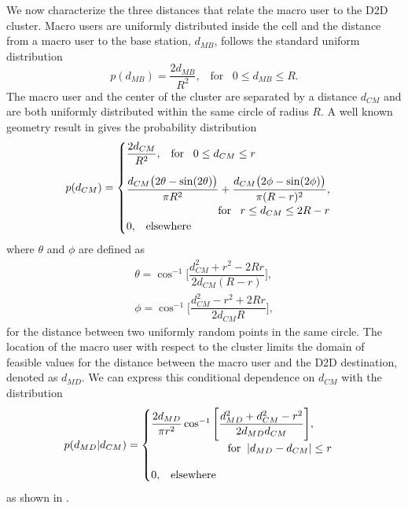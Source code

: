 \documentclass[10pt, final, journal, letterpaper,oneside, twocolumn]{IEEEtran}
\begin{document}
We now characterize the three distances that relate the macro user to the D2D cluster.  Macro users are uniformly distributed inside the cell and the distance from a macro user to the base station, $d_{MB}$, follows the standard uniform distribution
\begin{equation} 
p(d_{MB}) = \dfrac{2d_{MB}}{R^2}, \;\;\; \text{for} \;\;\; 0\leq d_{MB} \leq R. 
\label{eq:dmb}
\end{equation}
The macro user and the center of the cluster are separated by a distance $d_{CM}$ and are both uniformly distributed within the same circle of radius $R$.  A well known geometry result in \cite{geometry_prob} gives the probability distribution 
\begin{equation} 
p(d_{CM}) =
\begin{cases}
\dfrac{2d_{CM}}{R^2}, \;\;\; \text{for} \;\;\; 0\leq d_{CM} \leq r
\vspace{10pt}
\\
\dfrac{d_{CM}\big(2 \theta - \sin(2\theta) \big)}{\pi R^2} + \dfrac{d_{CM}\big(2 \phi - \sin(2\phi) \big)}{\pi (R-r)^2}, 
\\
\;\;\;\;\;\;\;\;\;\;\;\;\;\;\;\;\;\;\;\;\;\;\;\;\;\;\;\;\;\; \text{for} \;\;\; r \leq d_{CM} \leq 2R-r\\
0, \;\;\; \text{elsewhere}
\end{cases}
\label{eq:dcm}
\end{equation}
where $\theta$ and $\phi$ are defined as 
\begin{eqnarray} 
\theta = \cos^{-1}\Bigg[\dfrac{d_{CM}^2+r^2-2Rr}{2d_{CM}(R-r)}\Bigg],
\\
\phi = \cos^{-1}\Bigg[\dfrac{d_{CM}^2-r^2+2Rr}{2d_{CM}R}\Bigg],
\end{eqnarray}
for the distance between two uniformly random points in the same circle.  The location of the macro user with respect to the cluster limits the domain of feasible values for the distance between the macro user and the D2D destination, denoted as $d_{MD}$.  We can express this conditional dependence on $d_{CM}$ with the distribution
\begin{equation} 
p(d_{MD}|d_{CM}) = 
\begin{cases}
\dfrac{2d_{MD}}{\pi r^2} \cos^{-1}\Bigg[ \dfrac{d_{MD}^2+d_{CM}^2-r^2}{2d_{MD}d_{CM}}\Bigg],
\\
\;\;\;\;\;\;\;\;\;\;\;\;\;\;\;\;\;\;\;\;\;\;\;\;\; \text{for} \;\; |d_{MD} - d_{CM}|\leq r
\vspace{10pt}
\\
0, \;\;\; \text{elsewhere}
\end{cases}
\label{eq:dmd}
\end{equation}
as shown in \cite{geometry_prob}.
\end{document}
